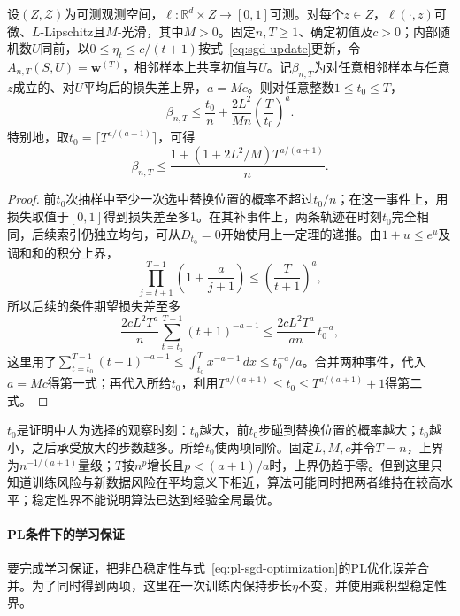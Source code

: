 \begin{theorem}[递减步长的非凸SGD泛化界]
\label{thm:nonconvex-sgd-decay}
设$(Z,\mathcal Z)$为可测观测空间，$\ell:\mathbb R^d\times Z\to[0,1]$可测。对每个$z\in Z$，$\ell(\cdot,z)$可微、$L$-Lipschitz且$M$-光滑，其中$M>0$。固定$n,T\geq1$、确定初值及$c>0$；内部随机数$U$同前，以$0\leq\eta_t\leq c/(t+1)$按式~\eqref{eq:sgd-update}更新，令$A_{n,T}(S,U)=\bm w^{(T)}$，相邻样本上共享初值与$U$。记$\beta_{n,T}$为对任意相邻样本与任意$z$成立的、对$U$平均后的损失差上界，$a=Mc$。则对任意整数$1\leq t_0\leq T$，
\[
 \beta_{n,T}\leq\frac{t_0}{n}
       +\frac{2L^2}{Mn}\left(\frac{T}{t_0}\right)^a.
\]
特别地，取$t_0=\lceil T^{a/(a+1)}\rceil$，可得
\[
 \beta_{n,T}\leq\frac{1+(1+2L^2/M)T^{a/(a+1)}}{n}.
\]
\end{theorem}
\begin{proof}
前$t_0$次抽样中至少一次选中替换位置的概率不超过$t_0/n$；在这一事件上，用损失取值于$[0,1]$得到损失差至多1。在其补事件上，两条轨迹在时刻$t_0$完全相同，后续索引仍独立均匀，可从$D_{t_0}=0$开始使用上一定理的递推。由$1+u\leq e^u$及调和和的积分上界，
\[
 \prod_{j=t+1}^{T-1}\left(1+\frac a{j+1}\right)
 \leq\left(\frac T{t+1}\right)^a,
\]
所以后续的条件期望损失差至多
\[
 \frac{2cL^2T^a}{n}\sum_{t=t_0}^{T-1}(t+1)^{-a-1}
 \leq\frac{2cL^2T^a}{an}\,t_0^{-a},
\]
这里用了$\sum_{t=t_0}^{T-1}(t+1)^{-a-1}\leq\int_{t_0}^{T}x^{-a-1}\,dx\leq t_0^{-a}/a$。合并两种事件，代入$a=Mc$得第一式；再代入所给$t_0$，利用$T^{a/(a+1)}\leq t_0\leq T^{a/(a+1)}+1$得第二式。
\end{proof}

$t_0$是证明中人为选择的观察时刻：$t_0$越大，前$t_0$步碰到替换位置的概率越大；$t_0$越小，之后承受放大的步数越多。所给$t_0$使两项同阶。固定$L,M,c$并令$T=n$，上界为$n^{-1/(a+1)}$量级；$T$按$n^p$增长且$p<(a+1)/a$时，上界仍趋于零。但到这里只知道训练风险与新数据风险在平均意义下相近，算法可能同时把两者维持在较高水平；稳定性界不能说明算法已达到经验全局最优。

\paragraph{PL条件下的学习保证}

要完成学习保证，把非凸稳定性与式~\eqref{eq:pl-sgd-optimization}的PL优化误差合并。为了同时得到两项，这里在一次训练内保持步长$\eta$不变，并使用乘积型稳定性界。


